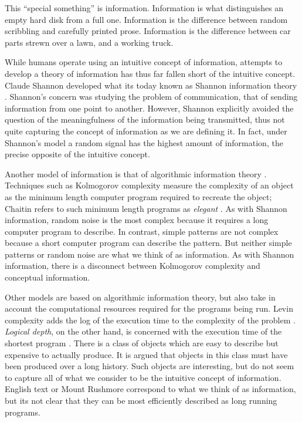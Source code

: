This ``special something'' is information.
Information is what distinguishes an empty hard disk from a full one.
Information is the difference between random scribbling and carefully printed prose.
Information is the difference between car parts strewn over a lawn, and a working truck.

While humans operate using an intuitive concept of information, attempts to develop a theory of information has thus far fallen short of the intuitive concept.
Claude Shannon developed what its today known as Shannon information theory \citep{Shannon1948}.
Shannon's concern was studying the problem of communication, that of sending information from one point to another.
However, Shannon explicitly avoided the question of the meaningfulness of the information being transmitted, thus not quite capturing the concept of information as we are defining it.
In fact, under Shannon's model a random signal has the highest amount of information, the precise opposite of the intuitive concept.

Another model of information is that of algorithmic information theory \citep{Chaitin1966, Solomonoff1960, Kolmogorov1968a}.
Techniques such as Kolmogorov complexity measure the complexity of an object as the minimum length computer program required to recreate the object; Chaitin refers to such minimum length programs as \textit{elegant} \cite{Chaitin2002}.
As with Shannon information, random noise is the most complex because it requires a long computer program to describe.
In contrast, simple patterns are not complex because a short computer program can describe the pattern.
But neither simple patterns or random noise are what we think of as information.
As with Shannon information, there is a disconnect between Kolmogorov complexity and conceptual information.

Other models are based on algorithmic information theory, but also take in account the computational resources required for the programs being run.
Levin complexity adds the log of the execution time to the complexity of the problem \citep{Levin1976}.
\textit{Logical depth}, on the other hand, is concerned with the execution time of the shortest program \citep{Bennett1988}.
There is a class of objects which are easy to describe but expensive to actually produce.
It is argued \citep{Bennett1988} that objects in this class must have been produced over a long history.
Such objects are interesting, but do not seem to capture all of what we consider to be the intuitive concept of information.
English text or Mount Rushmore correspond to what we think of as information, but its not clear that they can be most efficiently described as long running programs.

